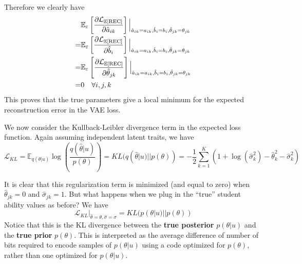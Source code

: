 Therefore we clearly have 
\begin{equation}
  \begin{split}
  &\mathbb{E}_\varepsilon \left[\frac{\partial \mathcal{L}_{\mathbb{E}[\text{REC}]}}{\partial \hat a_{ik}}\right] \Big|_{\hat a_{ik} = a_{ik}, \hat b_i = b_i, \hat \theta_{jk} = \theta_{jk}} \\
  = &\mathbb{E}_\varepsilon \left[\frac{\partial \mathcal{L}_{\mathbb{E}[\text{REC}]}}{\partial \hat b_i}\right] \Big|_{\hat a_{ik} = a_{ik}, \hat b_i = b_i, \hat \theta_{jk} = \theta_{jk}} \\
  = &\mathbb{E}_\varepsilon \left[\frac{\partial \mathcal{L}_{\mathbb{E}[\text{REC}]}}{\partial \hat \theta_{jk}}\right] \Big|_{\hat a_{ik} = a_{ik}, \hat b_i = b_i, \hat \theta_{jk} = \theta_{jk}} \\
  = &0 \quad \forall i,j,k
\end{split}
  \label{solve}
\end{equation}
This proves that the true parameters give a local minimum for the expected reconstruction error in the VAE loss.%

We now consider the Kullback-Leibler divergence term in the expected loss function. Again assuming independent latent traits, we have
\begin{equation}
  \mathcal{L}_{KL} = \mathbb{E}_{q(\theta | u)} \log \left( \frac{q(\hat \theta | u)}{p(\theta)} \right) = KL(q(\hat \theta |u) || p(\theta)) = -\frac{1}{2} \sum_{k=1}^K (1 + \log(\hat \sigma_k^2) - \hat \theta_k^2 - \hat \sigma_k^2)
  \label{eq:kl}
\end{equation}

It is clear that this regularization term is minimized (and equal to zero) when $\hat \theta_{jk} = 0$ and $\hat \sigma_{jk} = 1$. But what happens when we plug in the ``true'' student ability values as before? We have
\begin{equation}
  \mathcal{L}_{KL} \Big|_{\hat \theta = \theta, \hat \sigma = \sigma} = KL(p(\theta | u) || p(\theta))
  \label{eq}
\end{equation}
Notice that this is the KL divergence between the \textbf{true posterior} $p(\theta |u)$ and the \textbf{true prior} $p(\theta)$. This is interpreted as the average difference of number of bits required to encode samples of $p(\theta |u)$ using a code optimized for $p(\theta)$, rather than one optimized for $p(\theta | u)$. 



